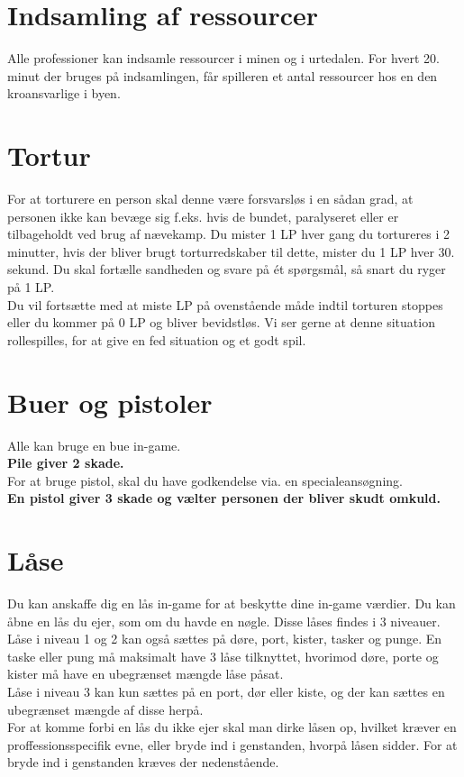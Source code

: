 \section*{Indsamling af ressourcer}
Alle professioner kan indsamle ressourcer i minen og i urtedalen. For hvert 20. minut der bruges på indsamlingen, får spilleren et antal ressourcer hos en den kroansvarlige i byen.

\section*{Tortur}
For at torturere en person skal denne være forsvarsløs i en sådan grad, at personen ikke kan bevæge sig f.eks. hvis de bundet, paralyseret eller er tilbageholdt ved brug af nævekamp.
Du mister 1 LP hver gang du tortureres i 2 minutter, hvis der bliver brugt torturredskaber til dette, mister du 1 LP hver 30. sekund.
Du skal fortælle sandheden og svare på ét spørgsmål, så snart du ryger på 1 LP.\\
Du vil fortsætte med at miste LP på ovenstående måde indtil torturen stoppes eller du kommer på 0 LP og bliver bevidstløs. Vi ser gerne at denne situation rollespilles, for at give en fed situation og et godt spil.

\newpage
\section*{Buer og pistoler}
Alle kan bruge en bue in-game.\\
\textbf{Pile giver 2 skade.}\\
For at bruge pistol, skal du have godkendelse via. en specialeansøgning.\\ 
\textbf{En pistol giver 3 skade og vælter personen der bliver skudt omkuld.}

\section*{Låse}
Du kan anskaffe dig en lås in-game for at beskytte dine in-game værdier. Du kan åbne en lås du ejer, som om du havde en nøgle. Disse låses findes i 3 niveauer.\\
Låse i niveau 1 og 2 kan også sættes på døre, port, kister, tasker og punge. En taske eller pung må maksimalt have 3 låse tilknyttet, hvorimod døre, porte og kister må have en ubegrænset mængde låse påsat.\\
Låse i niveau 3 kan kun sættes på en port, dør eller kiste, og der kan sættes en ubegrænset mængde af disse herpå.\\
For at komme forbi en lås du ikke ejer skal man dirke låsen op, hvilket kræver en proffessionsspecifik evne, eller bryde ind i genstanden, hvorpå låsen sidder. For at bryde ind i genstanden kræves der nedenstående.

